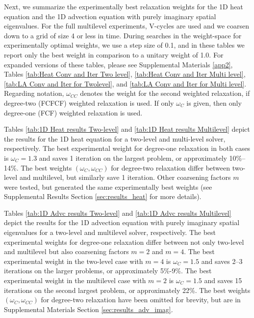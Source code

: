 \documentclass[VANCOUVER,STIX1COL]{WileyNJD-v2}
\begin{document}
Next, we summarize the experimentally best relaxation weights for the 1D heat equation and the 1D advection equation with purely imaginary spatial eigenvalues. 
For the full multilevel experiments, V-cycles are used and we coarsen down to a grid of size 4 or less in time.  During searches in the weight-space for experimentally optimal weights, we use a step size of 0.1, and in these tables we report only the best weight in comparison to a unitary weight of 1.0.  For expanded versions of these tables, please see Supplemental Materials \ref{app2}, 
Tables \ref{tab:Heat Conv and Iter Two level}, \ref{tab:Heat Conv and Iter Multi level}, \ref{tab:LA Conv and Iter for Twolevel}, and \ref{tab:LA Conv and Iter for Multi level}.   Regarding notation, $\omega_{CC}$ denotes the weight for the second weighted
relaxation, if degree-two (FCFCF) weighted relaxation is used.  If only
$\omega_C$ is given, then only degree-one (FCF) weighted relaxation is used. 

Tables \ref{tab:1D Heat results Two-level} and \ref{tab:1D Heat results Multilevel} depict the results for the 1D heat equation for a two-level and multi-level solver, respectively.  The best experimental weight for degree-one relaxation in both cases is $\omega_C=1.3$ and saves 1 iteration on the largest problem, or approximately 10\%--14\%.  The best weights $(\omega_C,\omega_{CC})$ for degree-two relaxation differ between two-level and multilevel, but similarly save 1 iteration. Other coarsening factors $m$ were tested, but generated the same experimentally best weights (see Supplemental Results Section  \ref{sec:results_heat} for more details).

Tables \ref{tab:1D Advc results Two-level} and \ref{tab:1D Advc results Multilevel} depict the results for the 1D advection equation with purely imaginary spatial eigenvalues for a two-level and multilevel solver, respectively. The best experimental weights for degree-one relaxation differ between not only two-level and multilevel but also coarsening factors $m=2$ and $m=4$. The best experimental weight in the two-level case with $m=4$ is $\omega_C=1.5$ and saves 2--3 iterations on the larger problems, or approximately 5\%-9\%. The best experimental weight in the multilevel case with $m=2$ is $\omega_C=1.5$ and saves 15 iterations on the second largest problem, or approximately 22\%.  The best weights $(\omega_C,\omega_{CC})$ for degree-two relaxation have been omitted for brevity, but are in Supplemental Materials Section \ref{sec:results_adv_imag}.
\end{document}
